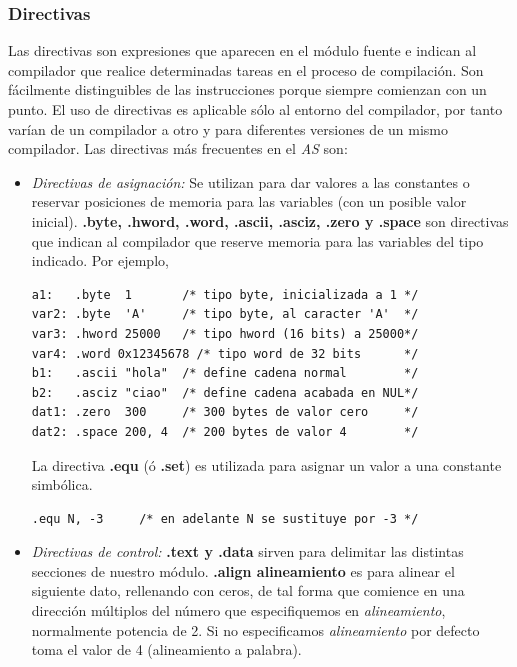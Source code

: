 \subsubsection{Directivas}

Las directivas son expresiones que aparecen en el módulo fuente e
indican al compilador que realice determinadas tareas en el proceso
de compilación. Son fácilmente distinguibles de las instrucciones
porque siempre comienzan con un punto. El uso de directivas es
aplicable sólo al entorno del compilador, por tanto varían de un
compilador a otro y para diferentes versiones de un mismo compilador.
Las directivas más frecuentes en el {\it AS} son:

\begin{itemize}
        \item \textit{Directivas de asignación:} Se utilizan para dar
valores a las constantes o reservar posiciones de memoria para las
variables (con un posible valor inicial).  \textbf{.byte, .hword, .word,
.ascii, .asciz, .zero y .space}
son directivas que indican al compilador que reserve memoria para
las variables del tipo indicado. Por ejemplo,

\begin{lstlisting}
a1:   .byte  1       /* tipo byte, inicializada a 1 */
var2: .byte  'A'     /* tipo byte, al caracter 'A'  */
var3: .hword 25000   /* tipo hword (16 bits) a 25000*/
var4: .word 0x12345678 /* tipo word de 32 bits      */
b1:   .ascii "hola"  /* define cadena normal        */
b2:   .asciz "ciao"  /* define cadena acabada en NUL*/
dat1: .zero  300     /* 300 bytes de valor cero     */
dat2: .space 200, 4  /* 200 bytes de valor 4        */
\end{lstlisting}

La directiva \textbf{.equ} (ó \textbf{.set}) es utilizada para asignar un
valor a una constante simbólica.

\begin{lstlisting}
.equ N, -3     /* en adelante N se sustituye por -3 */
\end{lstlisting}

\item \textit{Directivas de control:}
        \textbf{.text y .data} sirven para delimitar las distintas secciones
        de nuestro módulo.
        \textbf{.align {alineamiento}} es para alinear el siguiente dato,
        rellenando con ceros, de tal forma que comience en una dirección
        múltiplos del número que especifiquemos en {\it alineamiento},
        normalmente potencia de 2. Si no especificamos {\it alineamiento}
        por defecto toma el valor de 4 (alineamiento a palabra).


\end{itemize}
